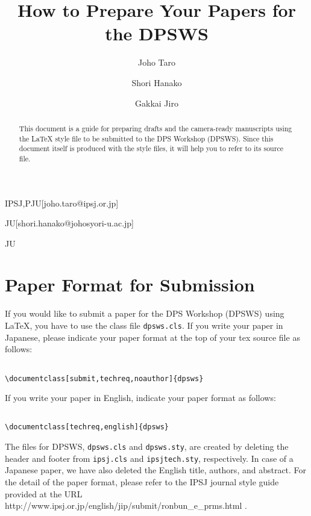 \documentclass[techreq,english]{dpsws}
\begin{document}
\title{How to Prepare Your Papers for the DPSWS}


\author{Joho Taro}{IPSJ,PJU}[joho.taro@ipsj.or.jp]
\author{Shori Hanako}{JU}[shori.hanako@johosyori-u.ac.jp]
\author{Gakkai Jiro}{JU}

\begin{abstract}
This document is a guide for preparing drafts 
and the camera-ready manuscripts using the {\LaTeX} style file
to be submitted to the DPS Workshop (DPSWS). 
Since this document itself is produced with the style files, 
it will help you to refer to its source file. 
\end{abstract}


\maketitle

\section{Paper Format for Submission}

If you would like to submit a paper 
for the DPS Workshop (DPSWS) using {\LaTeX}, 
you have to use the class file \texttt{dpsws.cls}. 
If you write your paper in Japanese, 
please indicate your paper format 
at the top of your tex source file as follows: 

\begin{verbatim}

\documentclass[submit,techreq,noauthor]{dpsws}

\end{verbatim}

If you write your paper in English, 
indicate your paper format as follows: 

\begin{verbatim}

\documentclass[techreq,english]{dpsws}

\end{verbatim}

The files for DPSWS, \texttt{dpsws.cls} and \texttt{dpsws.sty}, are created by deleting the header and footer from \texttt{ipsj.cls} and \texttt{ipsjtech.sty}, respectively.
In case of a Japanese paper, we have also deleted the English title, authors, and abstract.
For the detail of the paper format, 
please refer to the IPSJ journal style guide
provided at the URL
http://www.ipsj.or.jp/english/jip/submit/ronbun\_e\_prms.html
\cite{ipsjEFormat}. 
\end{document}
